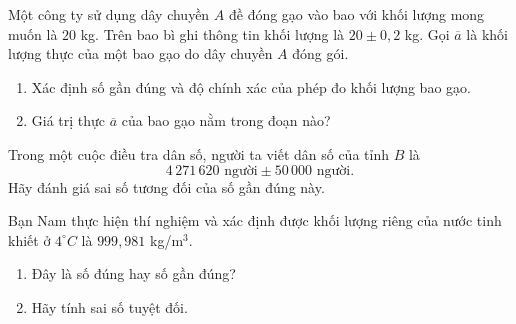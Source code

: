\begin{vd}
	Một công ty sử dụng dây chuyền $A$ đề đóng gạo vào bao với khối lượng mong muốn là $20$ kg. Trên bao bì ghi thông tin khối lượng là $20\pm 0{,}2$ kg. Gọi $\overline{a}$ là khối lượng thực của một bao gạo do dây chuyền $A$ đóng gói.
	\begin{enumerate}
		\item Xác định số gần đúng và độ chính xác của phép đo khối lượng bao gạo.
		\item Giá trị thực $\overline{a}$ của bao gạo nằm trong đoạn nào?
	\end{enumerate}
\end{vd}
\begin{vd}
	Trong một cuộc điều tra dân số, người ta viết dân số của tỉnh $B$ là
	$$4\,271\,620 \text{ người} \pm 50\,000 \text{ người}.$$
	Hãy đánh giá sai số tương đối của số gần đúng này.
\end{vd}
\begin{vd}
	Bạn Nam thực hiện thí nghiệm và xác định được khối lượng riêng của nước tinh khiết ở $4^\circ C$ là $999{,}981$ kg/m$^3$.
	\begin{enumerate}
		\item Đây là số đúng hay số gần đúng?
		\item Hãy tính sai số tuyệt đối.
	\end{enumerate}
\end{vd}

